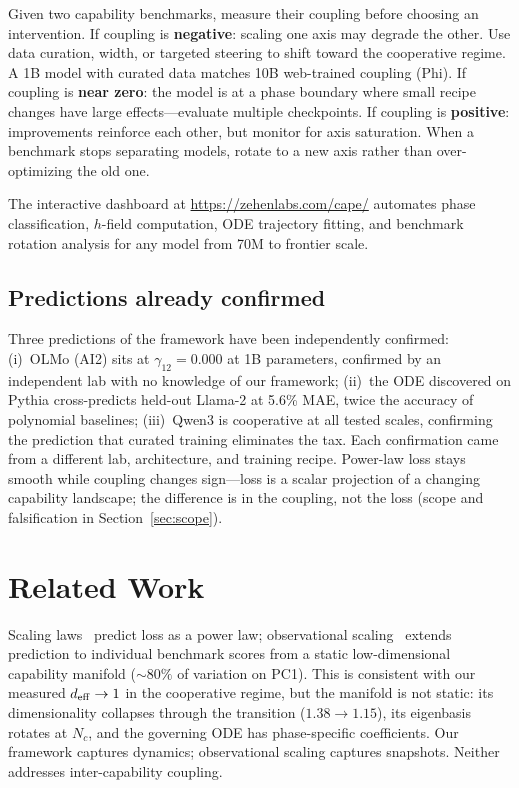 \documentclass{article}
\begin{document}
\begin{tcolorbox}[title=CAPE in practice: diagnose before scaling, colback=gray!5]
Given two capability benchmarks, measure their coupling before choosing an intervention.
If coupling is \textbf{negative}: scaling one axis may degrade the other.
Use data curation, width, or targeted steering to shift toward the cooperative regime.
A 1B model with curated data matches 10B web-trained coupling (Phi).
If coupling is \textbf{near zero}: the model is at a phase boundary where small recipe
changes have large effects---evaluate multiple checkpoints.
If coupling is \textbf{positive}: improvements reinforce each other,
but monitor for axis saturation.
When a benchmark stops separating models, rotate to a new axis
rather than over-optimizing the old one.
\end{tcolorbox}

\noindent The interactive dashboard at \url{https://zehenlabs.com/cape/}
automates phase classification, $h$-field computation, ODE trajectory fitting,
and benchmark rotation analysis for any model from 70M to frontier scale.

\subsection{Predictions already confirmed}

Three predictions of the framework have been independently confirmed:
(i)~OLMo (AI2) sits at $\gamma_{12} = 0.000$ at 1B parameters,
confirmed by an independent lab with no knowledge of our framework;
(ii)~the ODE discovered on Pythia cross-predicts held-out Llama-2
at 5.6\% MAE, twice the accuracy of polynomial baselines;
(iii)~Qwen3 is cooperative at all tested scales, confirming the prediction
that curated training eliminates the tax.
Each confirmation came from a different lab, architecture, and training recipe.
Power-law loss stays smooth while coupling changes sign---loss is a scalar projection
of a changing capability landscape; the difference is in the coupling, not the loss
(scope and falsification in Section~\ref{sec:scope}).

\section{Related Work}
\label{sec:related}

Scaling laws~\cite{kaplan2020,chinchilla2022} predict loss as a power law;
observational scaling~\cite{ruan2024} extends prediction to individual benchmark scores
from a static low-dimensional capability manifold (${\sim}80\%$ of variation on PC1).
This is consistent with our measured $d_{\rm eff} \to 1$ in the cooperative regime,
but the manifold is not static: its dimensionality collapses through the transition
($1.38 \to 1.15$), its eigenbasis rotates at $N_c$, and the governing ODE has
phase-specific coefficients. Our framework captures dynamics; observational scaling captures snapshots.
Neither addresses inter-capability coupling.
\end{document}
